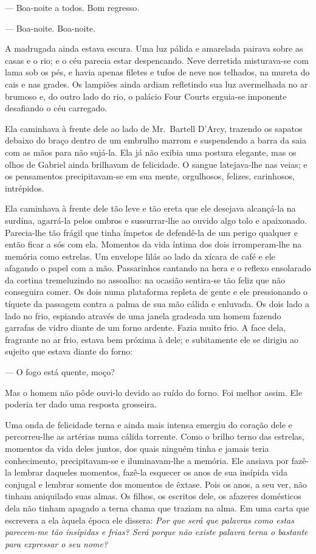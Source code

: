 --- Boa-noite a todos.  Bom regresso.

--- Boa-noite.  Boa-noite.

A madrugada ainda estava escura.  Uma luz pálida e amarelada pairava sobre as
casas e o rio; e o céu parecia estar despencando.  Neve derretida misturava-se
com lama sob os pés, e havia apenas filetes e tufos de neve nos telhados, na
mureta do cais e nas grades.  Os lampiões ainda ardiam refletindo sua luz
avermelhada no ar brumoso e, do outro lado do rio, o palácio Four Courts
erguia-se imponente desafiando o céu carregado.

Ela caminhava à frente dele ao lado de Mr.~Bartell D’Arcy, trazendo os sapatos
debaixo do braço dentro de um embrulho marrom e suspendendo a barra da saia com
as mãos para não sujá-la.  Ela já não exibia uma postura elegante, mas os olhos
de Gabriel ainda brilhavam de felicidade.  O sangue latejava-lhe nas veias; e
os pensamentos precipitavam-se em sua mente, orgulhosos, felizes, carinhosos,
intrépidos.

Ela caminhava à frente dele tão leve e tão ereta que ele desejava alcançá-la na
surdina, agarrá-la pelos ombros e sussurrar-lhe ao ouvido algo tolo e
apaixonado.  Parecia-lhe tão frágil que tinha ímpetos de defendê-la de um
perigo qualquer e então ficar a sós com ela.  Momentos da vida íntima dos dois
irromperam-lhe na memória como estrelas.  Um envelope lilás ao lado da xícara
de café e ele afagando o papel com a mão.  Passarinhos cantando na hera e o
reflexo ensolarado da cortina tremeluzindo no assoalho: na ocasião sentira-se
tão feliz que não conseguira comer.  Os dois numa plataforma repleta de gente e
ele pressionando o tíquete da passagem contra a palma de sua mão cálida e
enluvada.  Os dois lado a lado no frio, espiando através de uma janela gradeada
um homem fazendo garrafas de vidro diante de um forno ardente.  Fazia muito
frio.  A face dela, fragrante no ar frio, estava bem próxima à dele; e
subitamente ele se dirigiu ao sujeito que estava diante do forno:

--- O fogo está quente, moço?

Mas o homem não pôde ouvi-lo devido ao ruído do forno.  Foi melhor assim.  Ele
poderia ter dado uma resposta grosseira.

Uma onda de felicidade terna e ainda mais intensa emergiu do coração dele e
percorreu-lhe as artérias numa cálida torrente.  Como o brilho terno das
estrelas, momentos da vida deles juntos, dos quais ninguém tinha e jamais teria
conhecimento, precipitavam-se e iluminavam-lhe a memória.  Ele ansiava por
fazê-la lembrar daqueles momentos, fazê-la esquecer os anos de sua insípida
vida conjugal e lembrar somente dos momentos de êxtase.  Pois os anos, a seu
ver, não tinham aniquilado suas almas.  Os filhos, os escritos dele, os
afazeres domésticos dela não tinham apagado a terna chama que traziam na alma.
Em uma carta que escrevera a ela àquela época ele dissera: \textit{Por
que será que palavras como estas parecem-me tão insípidas e
frias? Será porque não existe palavra terna o bastante para expressar
o seu nome?}

